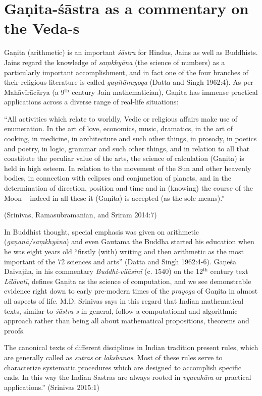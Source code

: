 \section*{Gaṇita-śāstra as a commentary on the Veda-s}

Gaṇita (arithmetic) is an important {\sl śāstra} for Hindus, Jains as well as Buddhists. Jains regard the knowledge of {\sl saṃkhyāna} (the science of numbers) as a particularly important accomplishment, and in fact one of the four branches of their religious literature is called {\sl gaṇitānuyoga} (Datta and Singh 1962:4). As per Mahāvīrācārya (a 9$^{\text{th}}$ century Jain mathematician), Gaṇita has immense practical applications across a diverse range of real-life situations: 
\begin{myquote}
``All activities which relate to worldly, Vedic or religious affairs make use of enumeration. In the art of love, economics, music, dramatics, in the art of cooking, in medicine, in architecture and such other things, in prosody, in poetics and poetry, in logic, grammar and such other things, and in relation to all that constitute the peculiar value of the arts, the science of calculation (Gaṇita) is held in high esteem. In relation to the movement of the Sun and other heavenly bodies, in connection with eclipses and conjunction of planets, and in the determination of direction, position and time and in (knowing) the course of the Moon -- indeed in all these it (Gaṇita) is accepted (as the sole means).''

\hfill (Srinivas, Ramasubramanian, and Sriram 2014:7)
\end{myquote}

In Buddhist thought, special emphasis was given on arithmetic ({\sl gaṇanā/saṃkhyāna}) and even Gautama the Buddha started his education when he was eight years old ``firstly (with) writing and then arithmetic as the most important of the 72 sciences and arts'' (Datta and Singh 1962:4-6). Gaṇeśa Daivajña, in his commentary {\sl Buddhi-vilāsinī} (c. 1540) on the 12$^{\text{th}}$ century text {\sl Līlāvatī}, defines Gaṇita as the science of computation, and we see demonstrable evidence right down to early pre-modern times of the {\sl prayoga} of Gaṇita in almost all aspects of life. M.D. Srinivas says in this regard that Indian mathematical texts, similar to {\sl śāstra-s} in general, follow a computational and algorithmic approach rather than being all about mathematical propositions, theorems and proofs. 
\begin{myquote}
The canonical texts of different disciplines in Indian tradition present rules, which are generally called as {\sl sutras} or {\sl lakshanas}. Most of these rules serve to characterize systematic procedures which are designed to accomplish specific ends. In this way the Indian Sastras are always rooted in {\sl vyavahāra} or practical applications.''
\hfill (Srinivas 2015:1)
\end{myquote}

